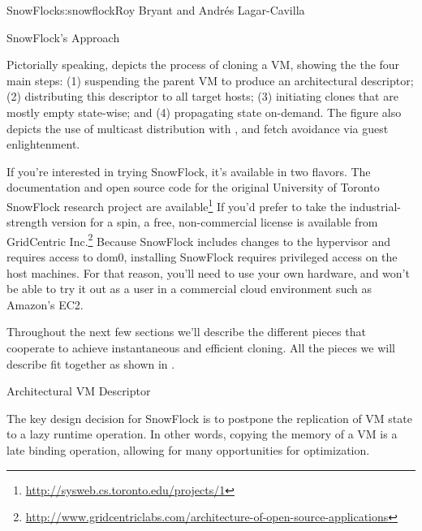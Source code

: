 \begin{aosachapter}{SnowFlock}{s:snowflock}{Roy Bryant and Andr\'e{s} Lagar-Cavilla}
\begin{aosasect1}{SnowFlock's Approach}
\begin{aosaitemize}
\end{aosaitemize}


Pictorially speaking,  depicts the
process of cloning a VM, showing the the four main steps: (1)
suspending the parent VM to produce an architectural descriptor; (2)
distributing this descriptor to all target hosts; (3) initiating
clones that are mostly empty state-wise; and (4) propagating state
on-demand. The figure also depicts the use of multicast distribution
with , and fetch avoidance via guest enlightenment.

If you're interested in trying SnowFlock, it's available in two
flavors.  The documentation and open source code for the original
University of Toronto SnowFlock research project are
available\footnote{\url{http://sysweb.cs.toronto.edu/projects/1}}
If you'd prefer to take
the industrial-strength version for a spin, a free, non-commercial
license is available from GridCentric 
Inc.\footnote{\url{http://www.gridcentriclabs.com/architecture-of-open-source-applications}}
Because SnowFlock includes changes to the hypervisor and requires
access to dom0, installing SnowFlock requires privileged access on the
host machines. For that reason, you'll need to use your own hardware,
and won't be able to try it out as a user in a commercial cloud
environment such as Amazon's EC2.

Throughout the next few sections we'll describe the different pieces
that cooperate to achieve instantaneous and efficient cloning. All
the pieces we will describe fit together as shown in
.


\end{aosasect1}

\begin{aosasect1}{Architectural VM Descriptor}

The key design decision for SnowFlock is to postpone the replication
of VM state to a lazy runtime operation. In other words, copying the
memory of a VM is a late binding operation, allowing for many
opportunities for optimization.


\end{aosasect1}
\end{aosachapter}
